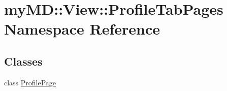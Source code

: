 \hypertarget{namespacemy_m_d_1_1_view_1_1_profile_tab_pages}{
\section{my\-MD::View::Profile\-Tab\-Pages Namespace Reference}
\label{dc/d0b/namespacemy_m_d_1_1_view_1_1_profile_tab_pages}
}


\subsection*{Classes}
\begin{CompactItemize}
\item 
class \hyperlink{classmy_m_d_1_1_view_1_1_profile_tab_pages_1_1_profile_page}{Profile\-Page}
\end{CompactItemize}

